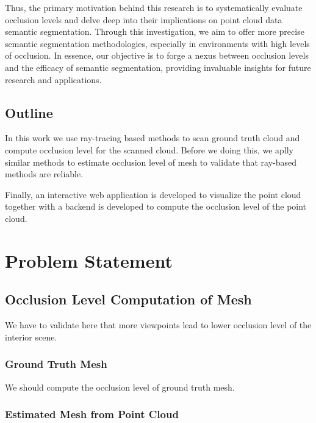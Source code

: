 \documentclass[11pt, a4paper,oneside,chapterprefix=false]{scrbook}
\begin{document}
Thus, the primary motivation behind this research is to systematically evaluate occlusion levels and delve deep into their implications on point cloud data semantic segmentation. Through this investigation, we aim to offer more precise semantic segmentation methodologies, especially in environments with high levels of occlusion. In essence, our objective is to forge a nexus between occlusion levels and the efficacy of semantic segmentation, providing invaluable insights for future research and applications.

\section{Outline} \label{sec:outline}

In this work we use ray-tracing based methods to scan ground truth cloud and compute occlusion level for the scanned cloud. Before we doing this, we aplly similar methods to estimate occlusion level of mesh to validate that ray-based methods are reliable.

Finally, an interactive web application is developed to visualize the point cloud together with a backend is developed to compute the occlusion level of the point cloud.


\chapter{Problem Statement} \label{chp:problem}



\section{Occlusion Level Computation of Mesh} \label{sec:occlusion}

We have to validate here that more viewpoints lead to lower occlusion level of the interior scene.

\subsection{Ground Truth Mesh} \label{subsec:occlusion}

We should compute the occlusion level of ground truth mesh.

\subsection{Estimated Mesh from Point Cloud} \label{subsec:occlusion}
\end{document}
